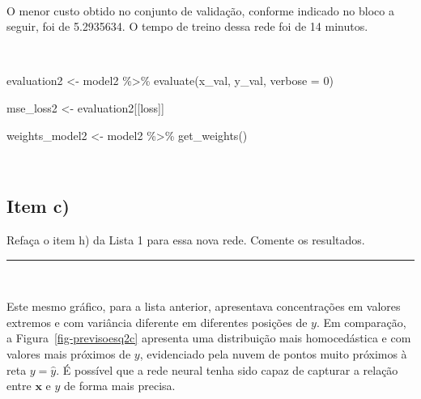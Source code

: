 \documentclass[
  a4paperpaper,
]{article}
\newenvironment{Shaded}{\begin{snugshade}}{\end{snugshade}}
\newcommand{\AttributeTok}[1]{\textcolor[rgb]{0.40,0.45,0.13}{#1}}
\newcommand{\DecValTok}[1]{\textcolor[rgb]{0.68,0.00,0.00}{#1}}
\newcommand{\FunctionTok}[1]{\textcolor[rgb]{0.28,0.35,0.67}{#1}}
\newcommand{\NormalTok}[1]{\textcolor[rgb]{0.00,0.23,0.31}{#1}}
\newcommand{\OtherTok}[1]{\textcolor[rgb]{0.00,0.23,0.31}{#1}}
\newcommand{\SpecialCharTok}[1]{\textcolor[rgb]{0.37,0.37,0.37}{#1}}
\newcommand{\StringTok}[1]{\textcolor[rgb]{0.13,0.47,0.30}{#1}}
\begin{document}
~

O menor custo obtido no conjunto de validação, conforme indicado no
bloco a seguir, foi de 5.2935634. O tempo de treino dessa rede foi de 14
minutos.

~

\begin{Shaded}
\begin{Highlighting}[]
\NormalTok{evaluation2 }\OtherTok{\textless{}{-}}\NormalTok{ model2 }\SpecialCharTok{\%\textgreater{}\%} \FunctionTok{evaluate}\NormalTok{(x\_val, y\_val, }\AttributeTok{verbose =} \DecValTok{0}\NormalTok{)}

\NormalTok{mse\_loss2 }\OtherTok{\textless{}{-}}\NormalTok{ evaluation2[[}\StringTok{\textquotesingle{}loss\textquotesingle{}}\NormalTok{]]}

\NormalTok{weights\_model2 }\OtherTok{\textless{}{-}}\NormalTok{ model2 }\SpecialCharTok{\%\textgreater{}\%} \FunctionTok{get\_weights}\NormalTok{()}
\end{Highlighting}
\end{Shaded}

~

\subsection{Item c)}\label{item-c-1}

Refaça o item h) da Lista 1 para essa nova rede. Comente os resultados.

\begin{center}\rule{0.5\linewidth}{0.5pt}\end{center}

~

Este mesmo gráfico, para a lista anterior, apresentava concentrações em
valores extremos e com variância diferente em diferentes posições de
\(y\). Em comparação, a Figura~\ref{fig-previsoesq2c} apresenta uma
distribuição mais homocedástica e com valores mais próximos de \(y\),
evidenciado pela nuvem de pontos muito próximos à reta \(y = \hat{y}\).
É possível que a rede neural tenha sido capaz de capturar a relação
entre \(\mathbf{x}\) e \(y\) de forma mais precisa.

~
\end{document}
